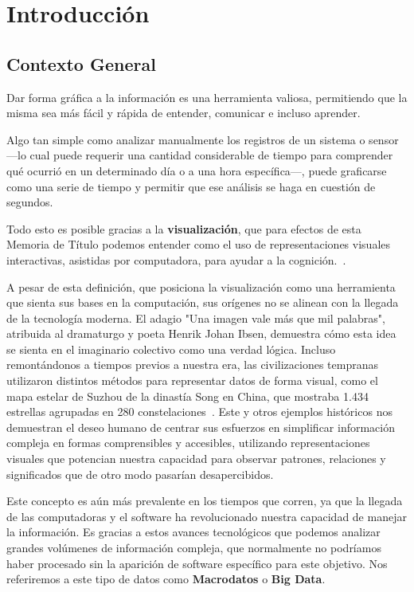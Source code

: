 \section{Introducción}
\subsection{Contexto General}

Dar forma gráfica a la información es una herramienta valiosa, permitiendo que la misma sea más fácil y rápida de entender, comunicar e incluso aprender. 

Algo tan simple como analizar manualmente los registros de un sistema o sensor—lo cual puede requerir una cantidad considerable de tiempo para comprender qué ocurrió en un determinado día o a una hora específica—, puede graficarse como una serie de tiempo y permitir que ese análisis se haga en cuestión de segundos.

Todo esto es posible gracias a la \textbf{visualización}, que para efectos de esta Memoria de Título podemos entender como el uso de representaciones visuales interactivas, asistidas por computadora, para ayudar a la cognición.~\cite{card1999readings}. 

A pesar de esta definición, que posiciona la visualización como una herramienta que sienta sus bases en la computación, sus orígenes no se alinean con la llegada de la tecnología moderna. El adagio "Una imagen vale más que mil palabras", atribuida al dramaturgo y poeta Henrik Johan Ibsen, demuestra cómo esta idea se sienta en el imaginario colectivo como una verdad lógica. Incluso remontándonos a tiempos previos a nuestra era, las civilizaciones tempranas utilizaron distintos métodos para representar datos de forma visual, como el mapa estelar de Suzhou de la dinastía Song en China, que mostraba 1.434 estrellas agrupadas en 280 constelaciones~\cite{bonnetbidaud2009dunhuang}. Este y otros ejemplos históricos nos demuestran el deseo humano de centrar sus esfuerzos en simplificar información compleja en formas comprensibles y accesibles, utilizando representaciones visuales que potencian nuestra capacidad para observar patrones, relaciones y significados que de otro modo pasarían desapercibidos.

Este concepto es aún más prevalente en los tiempos que corren, ya que la llegada de las computadoras y el software ha revolucionado nuestra capacidad de manejar la información. Es gracias a estos avances tecnológicos que podemos analizar grandes volúmenes de información compleja, que normalmente no podríamos haber procesado sin la aparición de software específico para este objetivo. Nos referiremos a este tipo de datos como \textbf{Macrodatos} o \textbf{Big Data}\cite{mcafee2012bigdata}.

